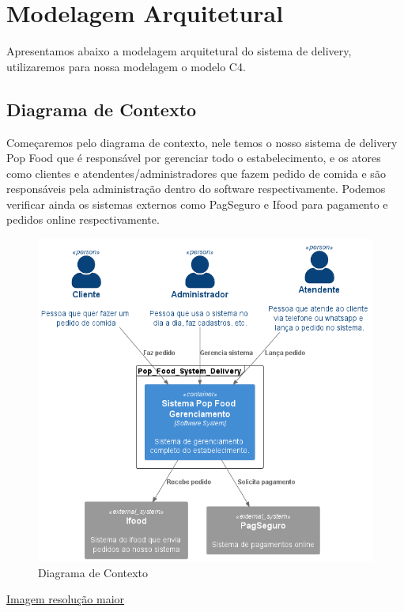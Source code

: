 \chapter{Modelagem Arquitetural}

Apresentamos abaixo a modelagem arquitetural do sistema de delivery, utilizaremos para nossa modelagem o modelo C4.

\section{Diagrama de Contexto}
Começaremos pelo diagrama de contexto, nele temos o nosso sistema de delivery Pop Food que é
responsável por gerenciar todo o estabelecimento, e os atores como clientes e atendentes/administradores que fazem pedido de comida
e são responsáveis pela administração dentro do software respectivamente. Podemos verificar ainda 
os sistemas externos como PagSeguro e Ifood para pagamento e pedidos online respectivamente.
\begin{figure}[h]
    \centering
    \includegraphics[width=1\textwidth]{diagrama_contexto.png}
    \caption{Diagrama de Contexto}
    \label{fig:Diagrama de Contexto}
  \end{figure}

  \href{https://github.com/soltein/TCC/blob/main/Diagramas/out/diagrama_contexto/diagrama_contexto.png}{Imagem resolução maior}

